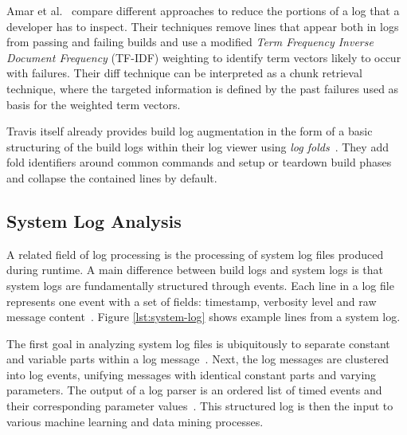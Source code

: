 Amar et al.~\cite{amar2019mining} compare different approaches to reduce the portions of a log that a developer has to inspect.
Their techniques remove lines that appear both in logs from passing and failing builds and use a modified \emph{Term Frequency Inverse Document Frequency} (TF-IDF) weighting to identify term vectors likely to occur with failures.
Their diff technique can be interpreted as a chunk retrieval technique, where the targeted information is defined by the past failures used as basis for the weighted term vectors.

Travis itself already provides build log augmentation in the form of a basic structuring of the build logs within their log viewer using \emph{log folds}~\cite{travis2019logfolds}.
They add fold identifiers around common commands and setup or teardown build phases and collapse the contained lines by default.

\subsection{System Log Analysis}
\label{sec:log-analysis}
A related field of log processing is the processing of system log files produced during runtime.
A main difference between build logs and system logs is that system logs are fundamentally structured through events.
Each line in a log file represents one event with a set of fields: timestamp, verbosity level and raw message content~\cite{he2017towards}.
Figure \ref{lst:system-log} shows example lines from a system log.

The first goal in analyzing system log files is ubiquitously to separate constant and variable parts within a log message~\cite{nagappan2010abstracting,he2017towards}.
Next, the log messages are clustered into log events, unifying messages with identical constant parts and varying parameters.
The output of a log parser is an ordered list of timed events and their corresponding parameter values~\cite{he2016evaluation}.
This structured log is then the input to various machine learning and data mining processes.

